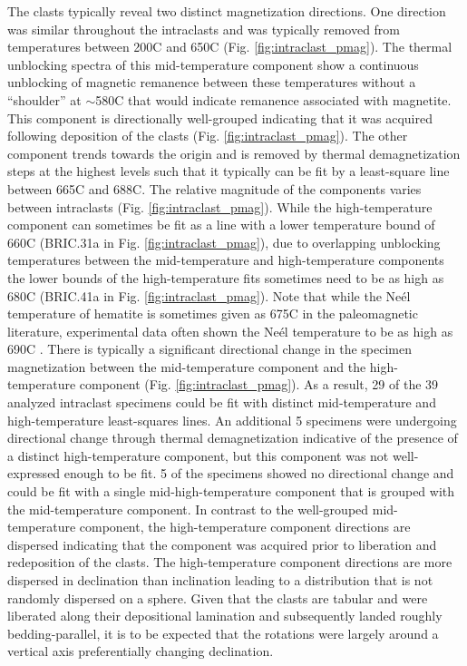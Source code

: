 \documentclass[11pt,letterpaper]{article}
\begin{document}
The clasts typically reveal two distinct magnetization directions. One direction was similar throughout the intraclasts and was typically removed from temperatures between 200\textdegree C and 650\textdegree C (Fig. \ref{fig:intraclast_pmag}). The thermal unblocking spectra of this mid-temperature component show a continuous unblocking of magnetic remanence between these temperatures without a ``shoulder'' at $\sim$580\textdegree C that would indicate remanence associated with magnetite. This component is directionally well-grouped indicating that it was acquired following deposition of the clasts (Fig. \ref{fig:intraclast_pmag}). The other component trends towards the origin and is removed by thermal demagnetization steps at the highest levels such that it typically can be fit by a least-square line between 665\textdegree C and 688\textdegree C. The relative magnitude of the components varies between intraclasts (Fig. \ref{fig:intraclast_pmag}). While the high-temperature component can sometimes be fit as a line with a lower temperature bound of 660\textdegree C (BRIC.31a in Fig. \ref{fig:intraclast_pmag}), due to overlapping unblocking temperatures between the mid-temperature and high-temperature components the lower bounds of the high-temperature fits sometimes need to be as high as 680\textdegree C (BRIC.41a in Fig. \ref{fig:intraclast_pmag}). Note that while the Ne\'el temperature of hematite is sometimes given as 675\textdegree C in the paleomagnetic literature, experimental data often shown the Ne\'el temperature to be as high as 690\textdegree C \citep{Ozdemir2006a}. There is typically a significant directional change in the specimen magnetization between the mid-temperature component and the high-temperature component (Fig. \ref{fig:intraclast_pmag}). As a result, 29 of the 39 analyzed intraclast specimens could be fit with distinct mid-temperature and high-temperature least-squares lines. An additional 5 specimens were undergoing directional change through thermal demagnetization indicative of the presence of a distinct high-temperature component, but this component was not well-expressed enough to be fit. 5 of the specimens showed no directional change and could be fit with a single mid-high-temperature component that is grouped with the mid-temperature component. In contrast to the well-grouped mid-temperature component, the high-temperature component directions are dispersed indicating that the component was acquired prior to liberation and redeposition of the clasts. The high-temperature component directions are more dispersed in declination than inclination leading to a distribution that is not randomly dispersed on a sphere. Given that the clasts are tabular and were liberated along their depositional lamination and subsequently landed roughly bedding-parallel, it is to be expected that the rotations were largely around a vertical axis preferentially changing declination.
\end{document}
